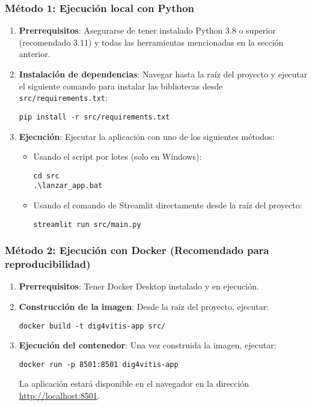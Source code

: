\subsubsection{Método 1: Ejecución local con Python}
\begin{enumerate}
\item \textbf{Prerrequisitos}: Asegurarse de tener instalado Python 3.8 o superior (recomendado 3.11) y todas las herramientas mencionadas en la sección anterior.
\item \textbf{Instalación de dependencias}: Navegar hasta la raíz del proyecto y ejecutar el siguiente comando para instalar las bibliotecas desde \texttt{src/requirements.txt}:
\begin{verbatim}
pip install -r src/requirements.txt
\end{verbatim}
\item \textbf{Ejecución}: Ejecutar la aplicación con uno de los siguientes métodos:
\begin{itemize}
\item Usando el script por lotes (solo en Windows):
\begin{verbatim}
cd src
.\lanzar_app.bat
\end{verbatim}
\item Usando el comando de Streamlit directamente desde la raíz del proyecto:
\begin{verbatim}
streamlit run src/main.py
 \end{verbatim}
 \end{itemize}
\end{enumerate}

\subsubsection{Método 2: Ejecución con Docker (Recomendado para reproducibilidad)}
\begin{enumerate}
 \item \textbf{Prerrequisitos}: Tener Docker Desktop instalado y en ejecución.
 \item \textbf{Construcción de la imagen}: Desde la raíz del proyecto, ejecutar:
 \begin{verbatim}
docker build -t dig4vitis-app src/
\end{verbatim}
 \item \textbf{Ejecución del contenedor}: Una vez construida la imagen, ejecutar:
 \begin{verbatim}
docker run -p 8501:8501 dig4vitis-app
 \end{verbatim}
 La aplicación estará disponible en el navegador en la dirección \url{http://localhost:8501}.
\end{enumerate}

